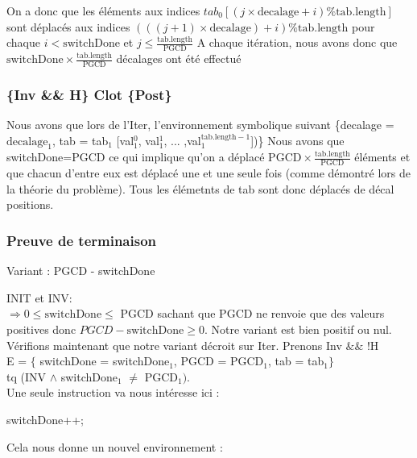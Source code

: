 On a donc que les éléments aux indices $tab_{0}[(j \times \mathrm{decalage} + i) \% \mathrm{tab.length}]$ sont déplacés aux indices $(((j+1)\times \mathrm{decalage})+i) \% \mathrm{tab.length}$ pour chaque $i < \mathrm{switchDone}$ et $j \leq \frac{\mathrm{tab.length}}{\mathrm{PGCD}}$ 
A chaque itération, nous avons donc que $\mathrm{switchDone} \times \frac {\mathrm{tab.length}}{\mathrm{PGCD}}$ décalages ont été effectué
\subsubsection*{\{Inv \&\& H\} Clot \{Post\}}
Nous avons que lors de l'Iter, l'environnement symbolique suivant \{decalage = $\mathrm{decalage}_{1}$, tab = tab$_{1}$ [val$_{1}^{0}$, val$_{1}^{1}$, ... ,val$_{1}^{\mathrm{tab.length}-1}$])\}
 Nous avons que switchDone=PGCD ce qui implique qu'on a déplacé
$\mathrm{PGCD}\times \frac{\mathrm{tab.length}}{\mathrm{PGCD}}$ éléments et
que chacun d'entre eux est déplacé une et une seule fois (comme démontré lors de la théorie du problème). Tous les élémetnts de tab sont donc déplacés de décal positions.

\subsubsection*{Preuve de terminaison}

Variant  : PGCD - switchDone

INIT et INV:\\
$\Rightarrow 0 \leq \mathrm{switchDone} \leq$ PGCD sachant que PGCD ne renvoie que des valeurs positives donc $PGCD - \mathrm{switchDone} \geq 0$. Notre variant est bien positif ou nul.\\ 

Vérifions maintenant que notre variant décroit sur Iter. Prenons Inv $\&\&$ !H \\

E = $\{$ switchDone = switchDone$_{1}$, PGCD = PGCD$_{1}$, tab = tab$_{1}\}$\\
tq (INV $\wedge$ switchDone$_{1}$ $\neq$ PGCD$_{1})$.\\

Une seule instruction va nous intéresse ici : \\

\begin{center}
  switchDone++;\\
\end{center} 
 
Cela nous donne un nouvel environnement :\\

